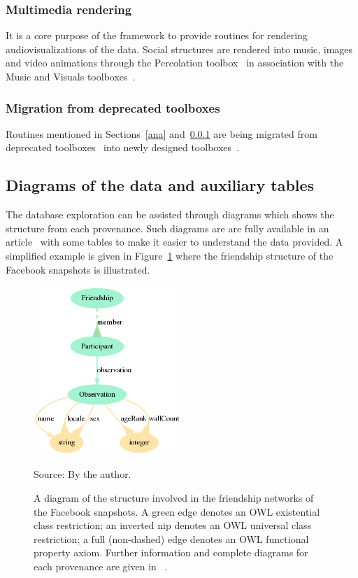 \subsubsection{Multimedia rendering}\label{media}
It is a core purpose of the framework to provide routines for rendering
audiovisualizations of the data.
Social structures are rendered into music, images and video animations
through the Percolation toolbox~\cite{percolation} in association with
the Music and Visuals toolboxes~\cite{music,visuals}.

\subsubsection{Migration from deprecated toolboxes}
Routines mentioned in Sections~\ref{ana} and~\ref{media} are being migrated from deprecated
toolboxes~\cite{gmaneLegacy,percolationLegacy} into newly designed
toolboxes~\cite{percolation,visuals}.

\subsection{Diagrams of the data and auxiliary tables}
The database exploration can be assisted through diagrams which shows
the structure from each provenance.
Such diagrams are
are fully available in an article~\cite{losd}
with some tables to make it easier to understand the data provided.
A simplified example is given in Figure~\ref{dia} where the friendship
structure of the Facebook snapshots is illustrated.

\begin{figure}[!ht]
\centering
\includegraphics[width=0.5\textwidth]{ontologies/facebook-legacy-AntonioAnzoategui18022013Friendship.ttl/draw}
\caption{A diagram of the structure involved in the friendship networks
of the Facebook snapshots.
A green edge denotes an OWL existential class restriction;
an inverted nip denotes an OWL universal class restriction;
a full (non-dashed) edge denotes an OWL functional property axiom.
Further information and complete diagrams for each provenance are given in ~\cite{losd}.}\label{dia}
\begin{flushleft}\footnotesize
Source: By the author.\
\end{flushleft}
\end{figure}


